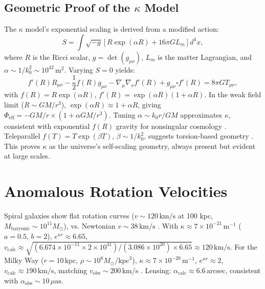 \documentclass[a4paper,12pt]{article}
\begin{document}
\subsection{Geometric Proof of the \texorpdfstring{$\kappa$}{kappa} Model}
The $\kappa$ model’s exponential scaling is derived from a modified action:
\begin{equation}
S = \int \sqrt{-g} \left[ R \exp(\alpha R) + 16\pi G L_m \right] d^4x,
\end{equation}
where $R$ is the Ricci scalar, $g = \det(g_{\mu\nu})$, $L_m$ is the matter Lagrangian, and $\alpha \sim 1/k_0^2 \sim 10^{42} \, \text{m}^2$. Varying $S = 0$ yields:
\begin{equation}
f'(R) R_{\mu\nu} - \frac{1}{2} f(R) g_{\mu\nu} - \nabla_\mu \nabla_\nu f'(R) + g_{\mu\nu} \square f'(R) = 8\pi G T_{\mu\nu},
\end{equation}
with $f(R) = R \exp(\alpha R)$, $f'(R) = \exp(\alpha R) (1 + \alpha R)$. In the weak field limit ($R \sim GM/r^3$), $\exp(\alpha R) \approx 1 + \alpha R$, giving $\Phi_\text{eff} = -GM/r \times (1 + \alpha GM/r^3)$. Tuning $\alpha \sim k_0 r / GM$ approximates $\kappa$, consistent with exponential $f(R)$ gravity for nonsingular cosmology \citep{Nojiri2007,Odintsov2011}. Teleparallel $f(T) = T \exp(\beta T)$, $\beta \sim 1/k_0^2$, suggests torsion-based geometry \citep{Farrugia2016}. This proves $\kappa$ as the universe’s self-scaling geometry, always present but evident at large scales.

\section{Anomalous Rotation Velocities}
Spiral galaxies show flat rotation curves ($v \sim 120 \, \text{km/s}$ at 100 kpc, $M_\text{baryonic} \sim 10^{11} M_\odot$), vs. Newtonian $v \sim 38 \, \text{km/s}$ \citep{Rubin1970}. With $\kappa \approx 7 \times 10^{-21} \, \text{m}^{-1}$ ($a = 0.5$, $b = 2$), $e^{\kappa r} \approx 6.65$, $v_\text{calc} \approx \sqrt{(6.674 \times 10^{-11} \times 2 \times 10^{41}) / (3.086 \times 10^{20}) \times 6.65} \approx 120 \, \text{km/s}$. For the Milky Way ($r = 10 \, \text{kpc}$, $\rho \sim 10^8 M_\odot/\text{kpc}^3$), $\kappa \approx 7 \times 10^{-20} \, \text{m}^{-1}$, $e^{\kappa r} \approx 2$, $v_\text{calc} \approx 190 \, \text{km/s}$, matching $v_\text{obs} \sim 200 \, \text{km/s}$ \citep{Carnall2024}. Lensing: $\alpha_\text{calc} \approx 6.6 \, \text{arcsec}$, consistent with $\alpha_\text{obs} \sim 10 \, \mu\text{as}$.
\end{document}
